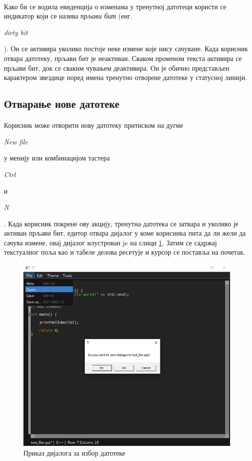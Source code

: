 \documentclass[12pt,oneside]{memoir}
\begin{document}
\paragraph{}
Како би се водила евиденција о изменама у тренутној датотеци користи
се индикатор који се назива \emph{прљави бит} (енг. \begin{latinica}\textit{dirty bit}\end{latinica}). Он се активира уколико постоје неке измене које нису сачуване.
Када корисник отвара датотеку, прљави бит је неактиван.
Сваком променом текста активира се прљави бит, док се сваким
чувањем деактивира. Он је обично представљен карактером звездице поред
имена тренутно отворене датотеке у статусној линији.

\subsection{Отварање нове датотеке}
\paragraph{}
Корисник може отворити нову датотеку притиском на дугме 
\begin{latinica}\textit{New file}\end{latinica} у менију или комбинацијом тастера
\begin{latinica}\textit{Ctrl}\end{latinica} и
\begin{latinica}\textit{N}\end{latinica}. Када корисник покрене ову акцију,
тренутна датотека се затвара и уколико је активан прљави бит, едитор отвара
дијалог у коме корисника пита да ли жели да сачува измене, овај дијалог
илустрован je на слици \ref{fig:save_changes_dialog}. Затим се садржај
текстуалног поља као и табеле делова ресетује и курсор се поставља на почетак.

\begin{figure}[!ht]
	\centering
	\includegraphics[width=1.0\textwidth]{images/save_changes_dialog.png}
	\caption{Приказ дијалога за избор датотеке}
	\label{fig:save_changes_dialog}
\end{figure}
\end{document}

